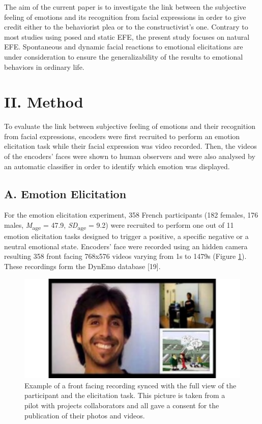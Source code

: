 \documentclass[conference,final,]{IEEEtran}
\makeatletter
\def\maxwidth{\ifdim\Gin@nat@width>\linewidth\linewidth
\else\Gin@nat@width\fi}
\let\Oldincludegraphics\includegraphics
\renewcommand{\includegraphics}[1]{\Oldincludegraphics[width=\maxwidth]{#1}}
\makeatother
\begin{document}
The aim of the current paper is to investigate the link between the
subjective feeling of emotions and its recognition from facial
expressions in order to give credit either to the behaviorist plea or to
the constructivist's one. Contrary to most studies using posed and
static EFE, the present study focuses on natural EFE. Spontaneous and
dynamic facial reactions to emotional elicitations are under
consideration to ensure the generalizability of the results to emotional
behaviors in ordinary life.

\hypertarget{ii.-method}{%
\section{II. Method}\label{ii.-method}}

To evaluate the link between subjective feeling of emotions and their
recognition from facial expressions, encoders were first recruited to
perform an emotion elicitation task while their facial expression was
video recorded. Then, the videos of the encoders' faces were shown to
human observers and were also analysed by an automatic classifier in
order to identify which emotion was displayed.

\hypertarget{a.-emotion-elicitation}{%
\subsection{A. Emotion Elicitation}\label{a.-emotion-elicitation}}

For the emotion elicitation experiment, 358 French participants (182
females, 176 males, \emph{M}\textsubscript{age} = 47.9,
\emph{SD}\textsubscript{age} = 9.2) were recruited to perform one out of
11 emotion elicitation tasks designed to trigger a positive, a specific
negative or a neutral emotional state. Encoders' face were recorded
using an hidden camera resulting 358 front facing 768x576 videos varying
from 1s to 1479s (Figure \ref{fig:dynemo_img}). These recordings form
the DynEmo database {[}19{]}.

\begin{figure}
\centering
\includegraphics{ACII_2019_paper_files/figure-latex/dynemo_img-1.pdf}
\caption{\label{fig:dynemo_img}Example of a front facing recording
synced with the full view of the participant and the elicitation task.
This picture is taken from a pilot with projects collaborators and all
gave a consent for the publication of their photos and videos.}
\end{figure}
\end{document}
